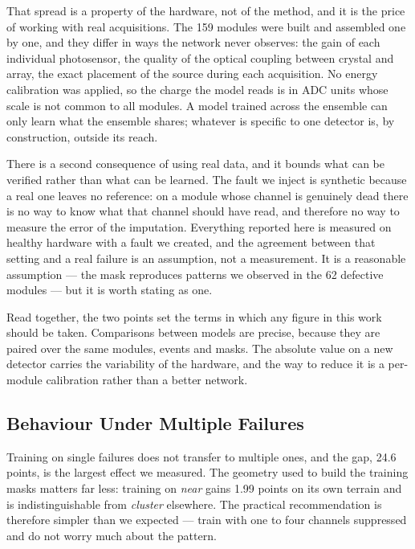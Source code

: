 \documentclass[10pt,conference]{IEEEtran}
\begin{document}
That spread is a property of the hardware, not of the method, and it is the
price of working with real acquisitions. The 159 modules were built and
assembled one by one, and they differ in ways the network never observes: the
gain of each individual photosensor, the quality of the optical coupling
between crystal and array, the exact placement of the source during each
acquisition. No energy calibration was applied, so the charge the model reads
is in ADC units whose scale is not common to all modules. A model trained
across the ensemble can only learn what the ensemble shares; whatever is
specific to one detector is, by construction, outside its reach.

There is a second consequence of using real data, and it bounds what can be
verified rather than what can be learned. The fault we inject is synthetic
because a real one leaves no reference: on a module whose channel is genuinely
dead there is no way to know what that channel should have read, and therefore
no way to measure the error of the imputation. Everything reported here is
measured on healthy hardware with a fault we created, and the agreement between
that setting and a real failure is an assumption, not a measurement. It is a
reasonable assumption --- the mask reproduces patterns we observed in the 62
defective modules --- but it is worth stating as one.

Read together, the two points set the terms in which any figure in this work
should be taken. Comparisons between models are precise, because they are
paired over the same modules, events and masks. The absolute value on a new
detector carries the variability of the hardware, and the way to reduce it is a
per-module calibration rather than a better network.

\subsection{Behaviour Under Multiple Failures}

Training on single failures does not transfer to multiple ones, and the gap,
24.6 points, is the largest effect we measured. The geometry used to build the
training masks matters far less: training on \emph{near} gains 1.99 points on
its own terrain and is indistinguishable from \emph{cluster} elsewhere. The
practical recommendation is therefore simpler than we expected --- train with
one to four channels suppressed and do not worry much about the pattern.
\end{document}
